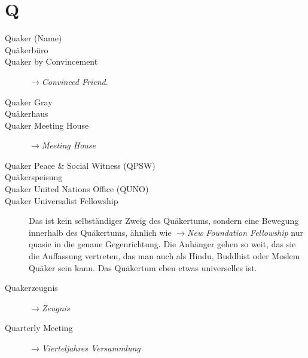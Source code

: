 \section*{Q}

\articlesize

\begin{description}

 \item[Quaker (Name)]

 \item[Quäkerbüro]

 \item[Quaker by Convincement] $\to$\textit{Convinced Friend}.

 \item[Quaker Gray]

 \item[Quäkerhaus]

 \item[Quaker Meeting House] $\to$\textit{Meeting House}

 \item[Quaker Peace \& Social Witness (QPSW)]

 \item[Quäkerspeisung]

 \item[Quaker United Nations Office (QUNO)]

 \item[Quaker Universalist Fellowship] Das ist kein selbständiger Zweig des Quäkertums, sondern eine Bewegung innerhalb des Quäkertums, ähnlich wie $\to$\textit{New Foundation Fellowship} nur quasie in die genaue Gegenrichtung. Die Anhänger gehen so weit, das sie die Auffassung vertreten, das man auch als Hindu, Buddhist oder Moslem Quäker sein kann. Das Quäkertum eben etwas universelles ist.

 \item[Quakerzeugnis] $\to$\textit{Zeugnis}

 \item[Quarterly Meeting] $\to$\textit{Vierteljahres Versammlung}

 \end{description}

\normalsize
